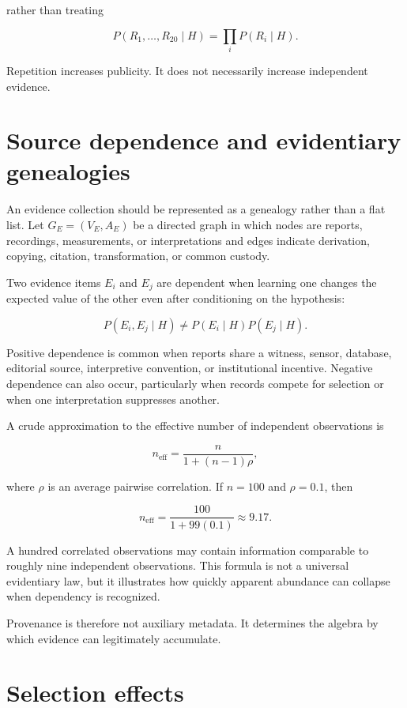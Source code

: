 rather than treating

\[
P(R_1,\ldots,R_{20}\mid H)
=
\prod_iP(R_i\mid H).
\]

Repetition increases publicity. It does not necessarily increase independent evidence.

\section{Source dependence and evidentiary genealogies}
\label{sec:a8}

An evidence collection should be represented as a genealogy rather than a flat list. Let \(G_E=(V_E,A_E)\) be a directed graph in which nodes are reports, recordings, measurements, or interpretations and edges indicate derivation, copying, citation, transformation, or common custody.

Two evidence items \(E_i\) and \(E_j\) are dependent when learning one changes the expected value of the other even after conditioning on the hypothesis:

\[
P(E_i,E_j\mid H)
\neq
P(E_i\mid H)P(E_j\mid H).
\]

Positive dependence is common when reports share a witness, sensor, database, editorial source, interpretive convention, or institutional incentive. Negative dependence can also occur, particularly when records compete for selection or when one interpretation suppresses another.

A crude approximation to the effective number of independent observations is

\[
n_{\mathrm{eff}}
=
\frac{n}
{1+(n-1)\rho},
\]

where \(\rho\) is an average pairwise correlation. If \(n=100\) and \(\rho=0.1\), then

\[
n_{\mathrm{eff}}
=
\frac{100}{1+99(0.1)}
\approx 9.17.
\]

A hundred correlated observations may contain information comparable to roughly nine independent observations. This formula is not a universal evidentiary law, but it illustrates how quickly apparent abundance can collapse when dependency is recognized.

Provenance is therefore not auxiliary metadata. It determines the algebra by which evidence can legitimately accumulate.

\section{Selection effects}
\label{sec:a9}

